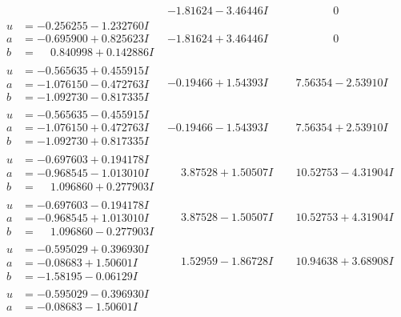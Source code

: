 \documentclass[1p]{elsarticle_modified}
\theoremstyle{definition}
\begin{document}
$$\begin{array}{c|c|c}
 & -1.81624 - 3.46446 I & \phantom{-0.000000 } 0 \\ \hline\begin{aligned}
u &= -0.256255 - 1.232760 I \\
a &= -0.695900 + 0.825623 I \\
b &= \phantom{-}0.840998 + 0.142886 I\end{aligned}
 & -1.81624 + 3.46446 I & \phantom{-0.000000 } 0 \\ \hline\begin{aligned}
u &= -0.565635 + 0.455915 I \\
a &= -1.076150 - 0.472763 I \\
b &= -1.092730 - 0.817335 I\end{aligned}
 & -0.19466 + 1.54393 I & \phantom{-}7.56354 - 2.53910 I \\ \hline\begin{aligned}
u &= -0.565635 - 0.455915 I \\
a &= -1.076150 + 0.472763 I \\
b &= -1.092730 + 0.817335 I\end{aligned}
 & -0.19466 - 1.54393 I & \phantom{-}7.56354 + 2.53910 I \\ \hline\begin{aligned}
u &= -0.697603 + 0.194178 I \\
a &= -0.968545 - 1.013010 I \\
b &= \phantom{-}1.096860 + 0.277903 I\end{aligned}
 & \phantom{-}3.87528 + 1.50507 I & \phantom{-}10.52753 - 4.31904 I \\ \hline\begin{aligned}
u &= -0.697603 - 0.194178 I \\
a &= -0.968545 + 1.013010 I \\
b &= \phantom{-}1.096860 - 0.277903 I\end{aligned}
 & \phantom{-}3.87528 - 1.50507 I & \phantom{-}10.52753 + 4.31904 I \\ \hline\begin{aligned}
u &= -0.595029 + 0.396930 I \\
a &= -0.08683 + 1.50601 I \\
b &= -1.58195 - 0.06129 I\end{aligned}
 & \phantom{-}1.52959 - 1.86728 I & \phantom{-}10.94638 + 3.68908 I \\ \hline\begin{aligned}
u &= -0.595029 - 0.396930 I \\
a &= -0.08683 - 1.50601 I \\

\end{aligned}
\end{array}$$
\end{document}
